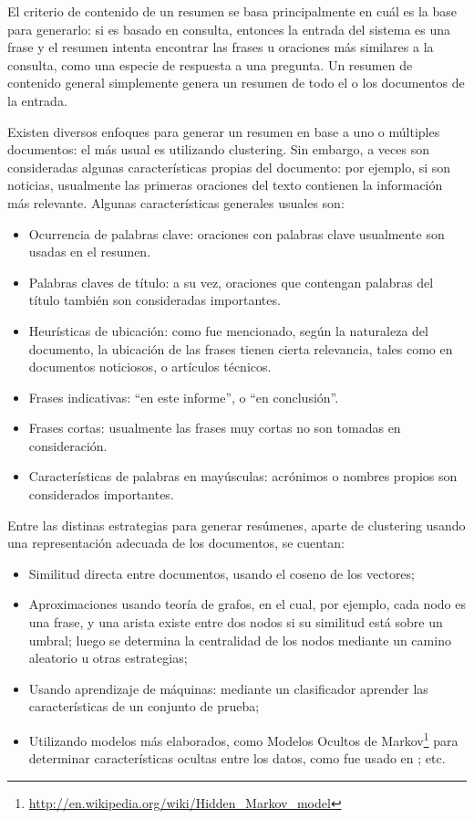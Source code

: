 \documentclass[upright, contnum]{umemoria}
\begin{document}
   El criterio de contenido de un resumen se basa principalmente en
   cuál es la base para generarlo: si es basado en consulta, entonces
   la entrada del sistema es una frase y el resumen intenta encontrar
   las frases u oraciones más similares a la consulta, como una
   especie de respuesta a una pregunta. Un resumen de contenido
   general simplemente genera un resumen de todo el o los documentos
   de la entrada.

   Existen diversos enfoques para generar un resumen en base a uno o
   múltiples documentos: el más usual es utilizando clustering. Sin
   embargo, a veces son consideradas algunas características propias
   del documento: por ejemplo, si son noticias, usualmente las
   primeras oraciones del texto contienen la información más
   relevante\cite{DBLP:conf:spire:Bravo-MarquezM12}. Algunas
   características generales usuales son:

\begin{itemize}
\item Ocurrencia de palabras clave: oraciones con palabras
     clave usualmente son usadas en el resumen.
\item Palabras claves de título: a su vez, oraciones que contengan
     palabras del título también son consideradas importantes.
\item Heurísticas de ubicación: como fue mencionado, según la
     naturaleza del documento, la ubicación de las frases tienen
     cierta relevancia, tales como en documentos noticiosos, o
     artículos técnicos.
\item Frases indicativas: ``en este informe'', o ``en conclusión''.
\item Frases cortas: usualmente las frases muy cortas no son tomadas en
     consideración.
\item Características de palabras en mayúsculas: acrónimos o nombres
     propios son considerados importantes.
\end{itemize}
   Entre las distinas estrategias para generar resúmenes, aparte de
   clustering usando una representación adecuada de los documentos, se
   cuentan:

\begin{itemize}
\item Similitud directa entre documentos, usando el coseno de los
     vectores;
\item Aproximaciones usando teoría de grafos, en el cual, por ejemplo,
     cada nodo es una frase, y una arista existe entre dos nodos si su
     similitud está sobre un umbral; luego se determina la centralidad
     de los nodos mediante un camino aleatorio u otras estrategias;
\item Usando aprendizaje de máquinas: mediante un clasificador aprender
     las características de un conjunto de prueba;
\item Utilizando modelos más elaborados, como Modelos Ocultos de
     Markov\footnote{\href{http://en.wikipedia.org/wiki/Hidden\_Markov\_model}{http://en.wikipedia.org/wiki/Hidden\_Markov\_model} }
     para determinar características ocultas entre los datos, como fue
     usado en \cite{chakrabarti2011event}; etc.
\end{itemize}
\end{document}
